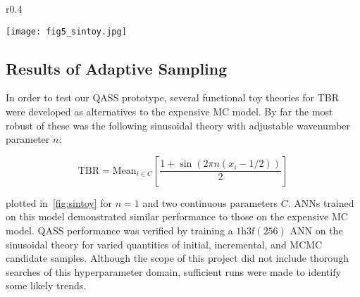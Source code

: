 \newpage

\begin{wrapfigure}{r}{0.4\textwidth}
  \vspace{-60pt}
  \begin{center}
    \texttt{[image: fig5\_sintoy.jpg]}
	\caption{Sinusoidal toy TBR theory over two continuous parameters, wavenumber 1}
    \label{fig:sintoy}
  \end{center}
  \vspace{-10pt}
\end{wrapfigure}

\subsection{Results of Adaptive Sampling}
\label{sec:adaptiveres}

In order to test our QASS prototype, several functional toy theories for TBR were developed as alternatives to the expensive MC model. By far the most robust of these was the following sinusoidal theory with adjustable wavenumber parameter $n$:

\begin{equation}
	\text{TBR} = \text{Mean}_{i \in C} \left[ \frac{1 + \sin(2\pi n (x_i - 1/2)) }{2} \right]
\end{equation}

plotted in~\cref{fig:sintoy} for $n=1$ and two continuous parameters $C$. ANNs
trained on this model demonstrated similar performance to those on the expensive
MC model. QASS performance was verified by training a $\text{1h3f}(256)$ ANN on
the sinusoidal theory for varied quantities of initial, incremental, and MCMC
candidate samples. Although the scope of this project did not include thorough
searches of this hyperparameter domain, sufficient runs were made to identify
some likely trends.

